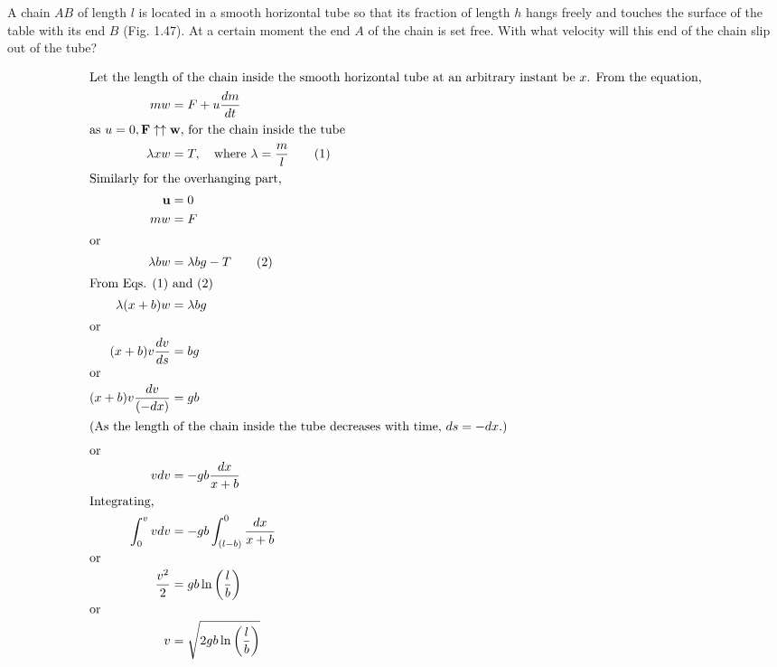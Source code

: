\item A chain $AB$ of length $l$ is located in a smooth horizontal tube so that its fraction of length $h$ hangs freely and touches the surface of the table with its end $B$ (Fig. 1.47). At a certain moment the end $A$ of the chain is set free. With what velocity will this end of the chain slip out of the tube?
    \begin{center}
    \end{center}\begin{solution}
    \begin{center}
    \end{center}
    
    \begin{align*}
        \intertext{Let the length of the chain inside the smooth horizontal tube at an arbitrary instant be \( x \). From the equation,}
        mw &= F + u \dfrac{dm}{dt}\\
        \intertext{as \( u = 0, \mathbf{F} \uparrow \uparrow \mathbf{w} \), for the chain inside the tube}
        \lambda xw &= T, \quad \text{where} \ \lambda = \dfrac{m}{l} \tag{1}\\
        \intertext{Similarly for the overhanging part,}
        \mathbf{u} &= 0\\
        mw &= F\\
        \intertext{or}
        \lambda bw &= \lambda bg - T \tag{2}\\
        \intertext{From Eqs. (1) and (2)}
        \lambda (x + b) w &= \lambda bg\\
        \intertext{or}
        (x + b) v \dfrac{dv}{ds} &= bg\\
        \intertext{or}
        (x + b) v \dfrac{dv}{(-dx)} &= gb\\
        \intertext{(As the length of the chain inside the tube decreases with time, \( ds = -dx \).)}
        \intertext{or}
        vdv &= -gb \dfrac{dx}{x + b}\\
        \intertext{Integrating,}
        \int_{0}^{v} vdv &= -gb \int_{(l - b)}^{0} \dfrac{dx}{x + b}\\
        \intertext{or}
        \dfrac{v^2}{2} &= gb \ln \left( \dfrac{l}{b} \right)\\
        \intertext{or}
        v &= \sqrt{2gb \ln \left( \dfrac{l}{b} \right)}
    \end{align*}
\end{solution}